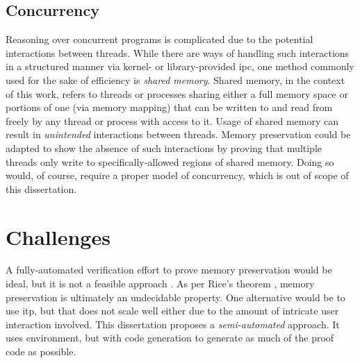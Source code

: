 \subsection{Concurrency}
Reasoning over concurrent programs is complicated
due to the potential interactions between threads.
While there are ways of handling such interactions in a structured manner
via kernel- or library-provided \ac{ipc},
one method commonly used for the sake of efficiency is \emph{shared memory}.
Shared memory, in the context of this work,
refers to threads or processes sharing either a full memory space
or portions of one (via memory mapping)
that can be written to and read from freely by any thread or process with access to it.
Usage of shared memory can result in \emph{unintended} interactions between threads.
Memory preservation could be adapted to show the absence of such interactions
by proving that multiple threads only write
to specifically-allowed regions of shared memory.
Doing so would, of course, require a proper model of concurrency,
which is out of scope of this dissertation.

\section{Challenges}
A fully-automated verification effort to prove memory preservation would be ideal,
but it is not a feasible approach \autocite{ouimet2008formal}.
As per Rice's theorem \autocite{rice1953classes},
memory preservation is ultimately an undecidable property.
One alternative would be to use \ac{itp}, but that does not scale well either
due to the amount of intricate user interaction involved.
This dissertation proposes a \emph{semi-automated} approach.
It uses  environment,
but with code generation to generate as much of the proof code as possible.

